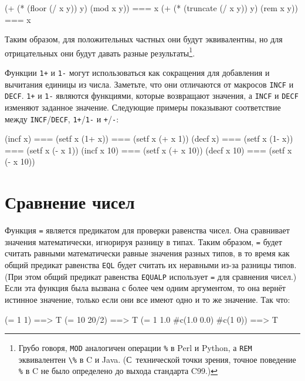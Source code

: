 \begin{myverb}
(+ (* (floor    (/ x y)) y) (mod x y)) === x
(+ (* (truncate (/ x y)) y) (rem x y)) === x
\end{myverb}

Таким образом, для положительных частных они будут эквивалентны, но для отрицательных они
будут давать разные результаты\footnote{Грубо говоря, \lstinline{MOD} аналогичен операции
  \lstinline{%} в Perl и Python, а \lstinline{REM} эквивалентен \lstinline{\%} в C и
  Java. (С~технической точки зрения, точное поведение \lstinline{%} в C не было определено до
  выхода стандарта C99.)}\hspace{\footnotenegspace}.

Функции \lstinline{1+} и \lstinline{1-} могут использоваться как сокращения для добавления и
вычитания единицы из числа.  Заметьте, что они отличаются от макросов \lstinline{INCF} и
\lstinline{DECF}.  \lstinline{1+} и \lstinline{1-} являются функциями, которые возвращают значения, а
\lstinline{INCF} и \lstinline{DECF} изменяют заданное значение.  Следующие примеры показывают
соответствие между \lstinline{INCF}/\lstinline{DECF}, \lstinline{1+}/\lstinline{1-} и \lstinline{+}/\lstinline{-}:

\begin{myverb}
(incf x)    === (setf x (1+ x)) === (setf x (+ x 1))
(decf x)    === (setf x (1- x)) === (setf x (- x 1))
(incf x 10) === (setf x (+ x 10))
(decf x 10) === (setf x (- x 10))
\end{myverb}

\section{Сравнение чисел}

Функция \lstinline{=} является предикатом для проверки равенства чисел.  Она сравнивает
значения математически, игнорируя разницу в типах.  Таким образом, \lstinline{=} будет считать
равными математически равные значения разных типов, в то время как общий предикат
равенства \lstinline{EQL} будет считать их неравными из-за разницы типов. (При этом общий
предикат равенства \lstinline{EQUALP} использует \lstinline{=} для сравнения чисел.)  Если эта
функция была вызвана с более чем одним аргументом, то она вернёт истинное значение, только
если они все имеют одно и то же значение. Так что:

\begin{myverb}
(= 1 1)                        ==> T
(= 10 20/2)                    ==> T
(= 1 1.0 #c(1.0 0.0) #c(1 0))  ==> T
\end{myverb}

